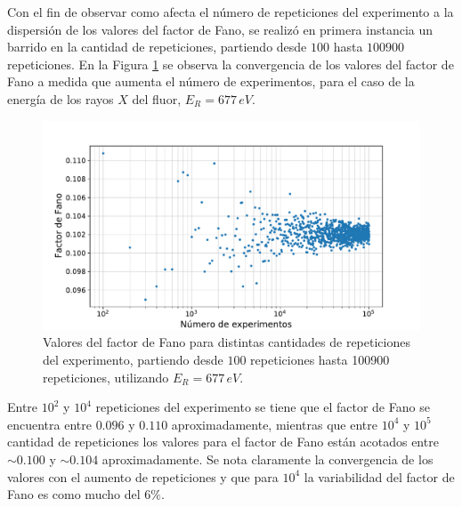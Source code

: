 Con el fin de observar como afecta el número de repeticiones del experimento a la dispersión de los valores del factor de Fano, se realizó en primera instancia un barrido en la cantidad de repeticiones, partiendo desde $100$ hasta $100900$ repeticiones. En la Figura \ref{fig:FanoConvergencia} se observa la convergencia de los valores del factor de Fano a medida que aumenta el número de experimentos, para el caso de la energía de los rayos $X$ del fluor, $E_{R} = 677\,\si{eV}$.
\begin{figure}[h]
    \centering
    \includegraphics[scale=0.5]{Figs/FanoConvergencia.pdf}
    \caption{Valores del factor de Fano para distintas cantidades de repeticiones del experimento, partiendo desde $100$ repeticiones hasta 100900 repeticiones, utilizando $E_{R} = 677\,\si{eV}$.}
    \label{fig:FanoConvergencia}
\end{figure}
Entre $10^{2}$ y $10^{4}$ repeticiones del experimento se tiene que el factor de Fano se encuentra entre $0.096$ y $0.110$ aproximadamente, mientras que entre $10^{4}$ y $10^{5}$ cantidad de repeticiones los valores para el factor de Fano están acotados entre $\sim 0.100$ y $\sim 0.104$ aproximadamente. Se nota claramente la convergencia de los valores con el aumento de repeticiones y que para $10^{4}$ la variabilidad del factor de Fano es como mucho del $6\%$.



